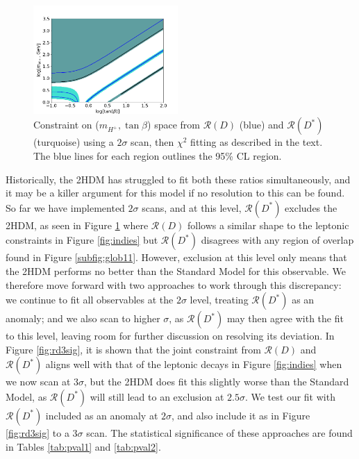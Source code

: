 \documentclass[a4paper,12pt]{article}
\begin{document}
\begin{figure}[ht]
    \centering
    \includegraphics[width=0.49\textwidth]{rd_both196sig.png}
    \caption{\label{fig:rds}Constraint on ($m_{H^+},\tan\beta$) space from $\mathcal{R}(D)$ (blue) and $\mathcal{R}(D^*)$ (turquoise) using a $2\sigma$ scan, then $\chi^2$ fitting as described in the text. 
    The blue lines for each region outlines the 95\% CL region.}
\end{figure}
Historically, the 2HDM has struggled to fit both these ratios simultaneously, and it may be a killer argument for this model if no resolution to this can be found. 
So far we have implemented $2\sigma$ scans, and at this level, $\mathcal{R}(D^*)$ excludes the 2HDM, as seen in Figure \ref{fig:rds} where $\mathcal{R}(D)$ follows a similar shape to the leptonic constraints in Figure \ref{fig:indies} but $\mathcal{R}(D^*)$ disagrees with any region of overlap found in Figure \ref{subfig:glob11}.
However, exclusion at this level only means that the 2HDM performs no better than the Standard Model for this observable. 
We therefore move forward with two approaches to work through this discrepancy: we continue to fit all observables at the $2\sigma$ level, treating $\mathcal{R}(D^*)$ as an anomaly; and we also scan to higher $\sigma$, as $\mathcal{R}(D^*)$ may then agree with the fit to this level, leaving room for further discussion on resolving its deviation.
In Figure \ref{fig:rd3sig}, it is shown that the joint constraint from $\mathcal{R}(D)$ and $\mathcal{R}(D^*)$ aligns well with that of the leptonic decays in Figure \ref{fig:indies} when we now scan at $3\sigma$, but the 2HDM does fit this slightly worse than the Standard Model, as $\mathcal{R}(D^*)$ will still lead to an exclusion at $2.5\sigma$. 
We test our fit with $\mathcal{R}(D^*)$ included as an anomaly at $2\sigma$, and also include it as in Figure \ref{fig:rd3sig} to a $3\sigma$ scan. 
The statistical significance of these approaches are found in Tables \ref{tab:pval1} and \ref{tab:pval2}.
\end{document}

